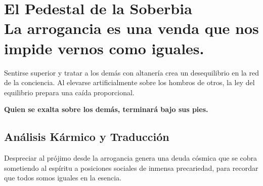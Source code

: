 \chapter[El Pedestal de la Soberbia]{El Pedestal de la Soberbia\\ \large La arrogancia es una venda que nos impide vernos como iguales.}


\lettrine[lines=3, nindent=0.5em, findent=0.2em]{S}{}entirse superior y tratar a los demás con altanería crea un desequilibrio en la red de la conciencia. Al elevarse artificialmente sobre los hombros de otros, la ley del equilibrio prepara una caída proporcional.

\vspace{1em}
\begin{center}
    \textbf{\Large Quien se exalta sobre los demás, terminará bajo sus pies.}
\end{center}
\vspace{1em}

\section{Análisis Kármico y Traducción}
\begin{figure}
  \vspace{-1.5em}
  \begin{center}
  \end{center}
  \vspace{-1.5em}
\end{figure}
Despreciar al prójimo desde la arrogancia genera una deuda cósmica que se cobra sometiendo al espíritu a posiciones sociales de inmensa precariedad, para recordar que todos somos iguales en la esencia.

